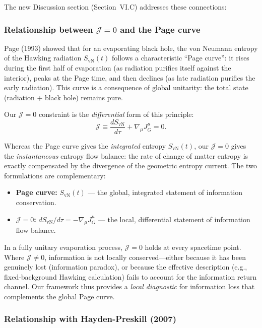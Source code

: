 \documentclass[11pt,a4paper]{article}
\begin{document}
The new Discussion section (Section~VI.C) addresses these connections:

\subsubsection*{Relationship between $\mathcal{J}=0$ and the Page curve}

Page (1993) showed that for an evaporating black hole, the von Neumann entropy of the Hawking radiation $S_{\text{vN}}(t)$ follows a characteristic ``Page curve'': it rises during the first half of evaporation (as radiation purifies itself against the interior), peaks at the Page time, and then declines (as late radiation purifies the early radiation). This curve is a consequence of global unitarity: the total state (radiation + black hole) remains pure.

Our $\mathcal{J}=0$ constraint is the \emph{differential} form of this principle:
\begin{equation}
\mathcal{J} \equiv \frac{dS_{\text{vN}}}{d\tau} + \nabla_\mu J^\mu_G = 0.
\end{equation}

Whereas the Page curve gives the \emph{integrated} entropy $S_{\text{vN}}(t)$, our $\mathcal{J}=0$ gives the \emph{instantaneous} entropy flow balance: the rate of change of matter entropy is exactly compensated by the divergence of the geometric entropy current. The two formulations are complementary:
\begin{itemize}[leftmargin=*]
\item \textbf{Page curve:} $S_{\text{vN}}(t)$ --- the global, integrated statement of information conservation.
\item \textbf{$\mathcal{J}=0$:} $dS_{\text{vN}}/d\tau = -\nabla_\mu J^\mu_G$ --- the local, differential statement of information flow balance.
\end{itemize}

In a fully unitary evaporation process, $\mathcal{J}=0$ holds at every spacetime point. Where $\mathcal{J} \neq 0$, information is not locally conserved---either because it has been genuinely lost (information paradox), or because the effective description (e.g., fixed-background Hawking calculation) fails to account for the information return channel. Our framework thus provides a \emph{local diagnostic} for information loss that complements the global Page curve.

\subsubsection*{Relationship with Hayden-Preskill (2007)}
\end{document}

